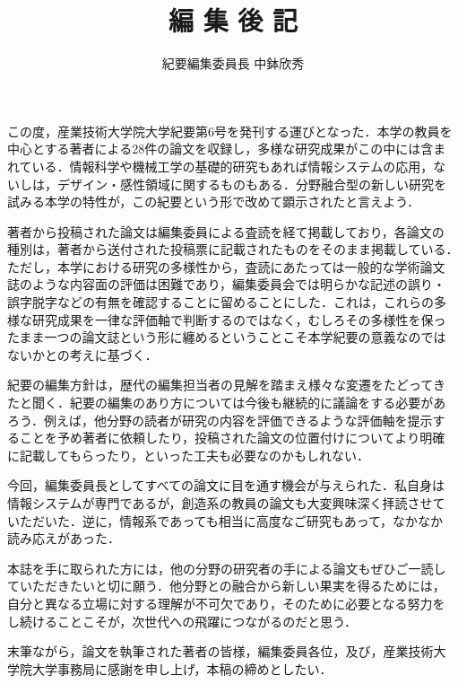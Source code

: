 \documentclass[a4j,twoside]{jarticle}
\title{編 集 後 記}
\author{紀要編集委員長 中鉢欣秀}
\date{}
\begin{document}
\pagestyle{empty}
\maketitle

この度，産業技術大学院大学紀要第6号を発刊する運びとなった．本学の教員を
中心とする著者による28件の論文を収録し，多様な研究成果がこの中には含ま
れている．情報科学や機械工学の基礎的研究もあれば情報システムの応用，な
いしは，デザイン・感性領域に関するものもある．分野融合型の新しい研究を
試みる本学の特性が，この紀要という形で改めて顕示されたと言えよう．

著者から投稿された論文は編集委員による査読を経て掲載しており，各論文の
種別は，著者から送付された投稿票に記載されたものをそのまま掲載している．
ただし，本学における研究の多様性から，査読にあたっては一般的な学術論文
誌のような内容面の評価は困難であり，編集委員会では明らかな記述の誤り・
誤字脱字などの有無を確認することに留めることにした．これは，これらの多
様な研究成果を一律な評価軸で判断するのではなく，むしろその多様性を保っ
たまま一つの論文誌という形に纏めるということこそ本学紀要の意義なのでは
ないかとの考えに基づく．

紀要の編集方針は，歴代の編集担当者の見解を踏まえ様々な変遷をたどってき
たと聞く．紀要の編集のあり方については今後も継続的に議論をする必要があ
ろう．例えば，他分野の読者が研究の内容を評価できるような評価軸を提示す
ることを予め著者に依頼したり，投稿された論文の位置付けについてより明確
に記載してもらったり，といった工夫も必要なのかもしれない．

今回，編集委員長としてすべての論文に目を通す機会が与えられた．私自身は
情報システムが専門であるが，創造系の教員の論文も大変興味深く拝読させて
いただいた．逆に，情報系であっても相当に高度なご研究もあって，なかなか
読み応えがあった．

本誌を手に取られた方には，他の分野の研究者の手による論文もぜひご一読し
ていただきたいと切に願う．他分野との融合から新しい果実を得るためには，
自分と異なる立場に対する理解が不可欠であり，そのために必要となる努力を
し続けることこそが，次世代への飛躍につながるのだと思う．

末筆ながら，論文を執筆された著者の皆様，編集委員各位，及び，産業技術大
学院大学事務局に感謝を申し上げ，本稿の締めとしたい．
\end{document}
